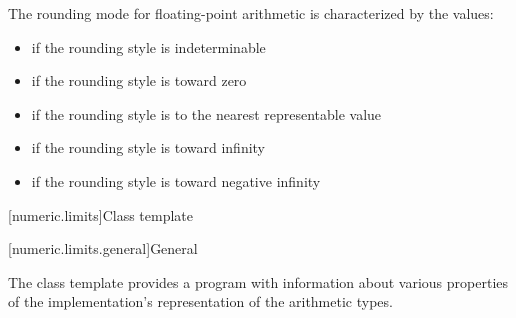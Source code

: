 \pnum
The rounding mode for floating-point arithmetic is characterized by the
values:
\begin{itemize}
\item
{}%
if the rounding style is indeterminable
\item
{}%
if the rounding style is toward zero
\item
{}%
if the rounding style is to the nearest representable value
\item
{}%
if the rounding style is toward infinity
\item
{}%
if the rounding style is toward negative infinity
\end{itemize}

[numeric.limits]{Class template }

[numeric.limits.general]{General}

\pnum
The
%
class template provides a \Cpp{} program with information about various properties of
the implementation's representation of the
arithmetic types.


